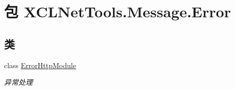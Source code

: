 \hypertarget{namespace_x_c_l_net_tools_1_1_message_1_1_error}{\section{包 X\-C\-L\-Net\-Tools.\-Message.\-Error}
\label{namespace_x_c_l_net_tools_1_1_message_1_1_error}
}
\subsection*{类}
\begin{DoxyCompactItemize}
\item 
class \hyperlink{class_x_c_l_net_tools_1_1_message_1_1_error_1_1_error_http_module}{Error\-Http\-Module}
\begin{DoxyCompactList}\small\item\em 异常处理 \end{DoxyCompactList}\end{DoxyCompactItemize}
